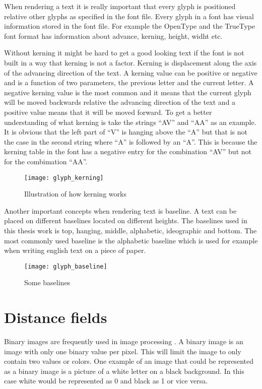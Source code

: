 When rendering a text it is really important that every glyph is positioned relative other glyphs as specified in the font file. Every glyph in a font has visual information stored in the font file. For example the OpenType and the TrueType\texttrademark{} font format has information about advance, kerning, height, widht etc\citep{OpenType, TrueType}.

Without kerning it might be hard to get a good looking text if the font is not built in a way that kerning is not a factor. Kerning is displacement along the axis of the advancing direction of the text. A kerning value can be positive or negative and is a function of two parameters, the previous letter and the current letter. A negative kerning value is the most common and it means that the current glyph will be moved backwards relative the advancing direction of the text and a positive value means that it will be moved forward. To get a better understanding of what kerning is take the strings ``AV'' and ``AA'' as an example. It is obvious that the left part of ``V'' is hanging above the ``A'' but that is not the case in the second string where ``A'' is followed by an ``A''. This is because the kerning table in the font has a negative entry for the combination ``AV'' but not for the combimation ``AA''. \citep{FreeTypeKern}

\begin{figure}[H]
\texttt{[image: glyph\_kerning]}
\caption{Illustration of how kerning works}
\end{figure}

Another important concepts when rendering text is baseline. A text can be placed on different baselines located on different heights. The baselines used in this thesis work is top, hanging, middle, alphabetic, ideographic and bottom. The most commonly used baseline is the alphabetic baseline which is used for example when writing english text on a piece of paper.

\begin{figure}[H]
\texttt{[image: glyph\_baseline]}
\caption{Some baselines}
\end{figure}

\section{Distance fields}\label{distancefield}
Binary images are frequently used in image processing \citep{Ragnemalm:1993}. A binary image is an image with only one binary value per pixel. This will limit the image to only contain two values or colors. One example of an image that could be represented as a binary image is a picture of a white letter on a black background. In this case white would be represented as 0 and black as 1 or vice versa.

